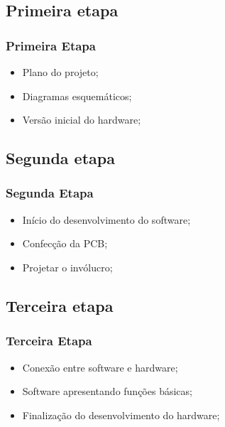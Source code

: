\documentclass[hyperref={pdfpagelabels=false}]{beamer}
\begin{document}
        \subsection{Primeira etapa}

            \begin{frame}\frametitle{Primeira Etapa}

                \begin{itemize}
           	        \item Plano do projeto;
            	    \item Diagramas esquemáticos;
        	        \item Versão inicial do hardware;
             	\end{itemize}

            \end{frame}

        \subsection{Segunda etapa}

            \begin{frame}\frametitle{Segunda Etapa}

        	   \begin{itemize}
           	        \item Início do desenvolvimento do software;
            	    \item Confecção da PCB;
        	        \item Projetar o invólucro;
               \end{itemize}

            \end{frame}

        \subsection{Terceira etapa}

            \begin{frame}\frametitle{Terceira Etapa}

        	   \begin{itemize}
       	             \item Conexão entre software e hardware;
       	             \item Software apresentando funções básicas;
        	         \item Finalização do desenvolvimento do hardware;
               \end{itemize}

            \end{frame}
\end{document}
